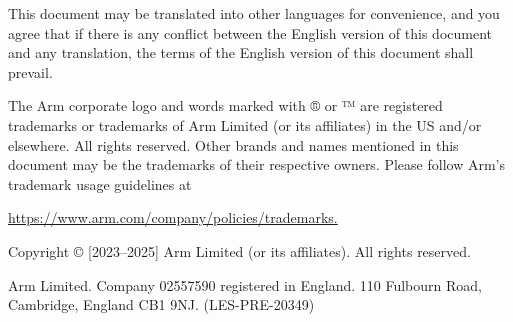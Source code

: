 This document may be translated into other languages for convenience, and you
agree that if there is any conflict between the English version of this
document and any translation, the terms of the English version of this document
shall prevail.

The Arm corporate logo and words marked with ® or ™ are registered trademarks
or trademarks of Arm Limited (or its affiliates) in the US and/or elsewhere.
All rights reserved.  Other brands and names mentioned in this document may be
the trademarks of their respective owners. Please follow Arm’s trademark usage
guidelines at

\url{https://www.arm.com/company/policies/trademarks.}

Copyright © [2023--2025] Arm Limited (or its affiliates). All rights reserved.

Arm Limited. Company 02557590 registered in England.  110 Fulbourn Road,
Cambridge, England CB1 9NJ.  (LES-PRE-20349)
